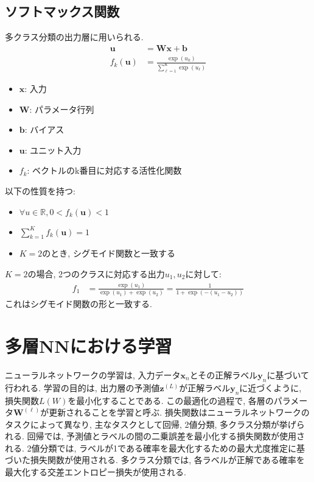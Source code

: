 \documentclass[dvipdfmx, 10pt]{jsarticle}
\begin{document}
\begin{framed}
\subsection*{ソフトマックス関数}
多クラス分類の出力層に用いられる. 
\begin{align*}
    \mathbf{u} &= \mathbf{W} \mathbf{x} + \mathbf{b} \\
    f_k(\mathbf{u}) &= \frac{\exp(u_k)}{\sum^{K}_{\ell=1} \exp(u_{\ell})}
\end{align*}
\begin{itemize}
    \item $\mathbf{x}$: 入力
    \item $\mathbf{W}$: パラメータ行列
    \item $\mathbf{b}$: バイアス
    \item $\mathbf{u}$: ユニット入力
    \item $f_k$: ベクトルのk番目に対応する活性化関数
\end{itemize}

以下の性質を持つ: 
\begin{itemize}
    \item $\forall u \in \mathbb{R}, 0 < f_k(\mathbf{u}) < 1$
    \item $\sum^{K}_{k=1} f_k(\mathbf{u}) = 1$
    \item $K=2$のとき, シグモイド関数と一致する
\end{itemize}

$K = 2$の場合, 2つのクラスに対応する出力$u_1, u_2$に対して: 
\begin{align*}
    f_1 &= \frac{\exp(u_1)}{\exp(u_1) + \exp(u_2)} = \frac{1}{1 + \exp(-(u_1 - u_2))}
\end{align*}
これはシグモイド関数の形と一致する. 

\end{framed}

\section*{多層NNにおける学習}
ニューラルネットワークの学習は, 入力データ\(\mathbf{x}_n\)とその正解ラベル\(\mathbf{y}_n\)に基づいて行われる. 
学習の目的は, 出力層の予測値\(\mathbf{z}^{(L)}\)が正解ラベル\(\mathbf{y}_n\)に近づくように, 損失関数\(L(W)\)を最小化することである. 
この最適化の過程で, 各層のパラメータ\(\mathbf{W}^{(\ell)}\)が更新されることを学習と呼ぶ. 
損失関数はニューラルネットワークのタスクによって異なり, 主なタスクとして回帰, 2値分類, 多クラス分類が挙げられる. 
回帰では, 予測値とラベルの間の二乗誤差を最小化する損失関数が使用される. 
2値分類では, ラベルが1である確率を最大化するための最大尤度推定に基づいた損失関数が使用される. 
多クラス分類では, 各ラベルが正解である確率を最大化する交差エントロピー損失が使用される. 
\end{document}
